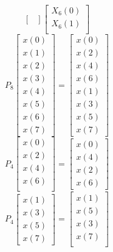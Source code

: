 \documentclass[journal,12pt,twocolumn]{IEEEtran}
\renewcommand\thesection{\arabic{section}}
\begin{document}
\begin{enumerate}[label=\arabic*.,ref=\thesection.\theenumi]
\begin{equation}
\begin{bmatrix}
\end{bmatrix}
\begin{bmatrix}
X_{6}(0) \\ 
X_{6}(1) \\ 
\end{bmatrix}
\end{equation}
\begin{equation}
P_{8}
\begin{bmatrix}
x(0) \\ 
x(1) \\ 
x(2) \\ 
x(3) \\ 
x(4) \\ 
x(5) \\
x(6) \\
x(7)
\end{bmatrix}
 = 
\begin{bmatrix}
x(0) \\ 
x(2) \\ 
x(4) \\ 
x(6) \\
x(1) \\ 
x(3) \\ 
x(5) \\
x(7)
\end{bmatrix}
\end{equation}
\begin{equation}
P_{4}
\begin{bmatrix}
x(0) \\ 
x(2) \\ 
x(4) \\ 
x(6) \\
\end{bmatrix}
 = 
\begin{bmatrix}
x(0) \\ 
x(4) \\ 
x(2) \\
x(6)
\end{bmatrix}
\end{equation}
\begin{equation}
P_{4}
\begin{bmatrix}
x(1) \\ 
x(3) \\ 
x(5) \\
x(7)
\end{bmatrix}
 = 
\begin{bmatrix}
x(1) \\ 
x(5) \\ 
x(3) \\ 
x(7) \\

\end{bmatrix}
\end{equation}
\end{enumerate}
\end{document}
